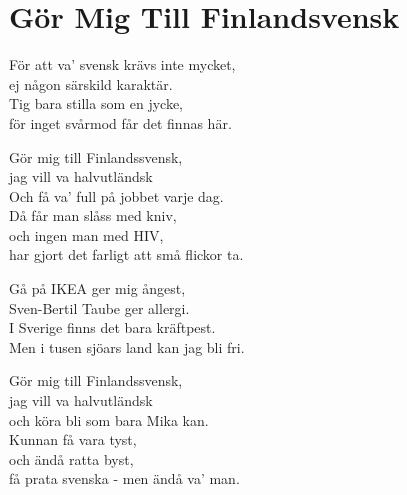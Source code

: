 \section{Gör Mig Till Finlandsvensk}
För att va’ svensk krävs inte mycket,\\
ej någon särskild karaktär.\\
Tig bara stilla som en jycke,\\
för inget svårmod får det finnas här.

Gör mig till Finlandssvensk,\\
jag vill va halvutländsk\\
Och få va’ full på jobbet varje dag.\\
Då får man slåss med kniv,\\
och ingen man med HIV,\\
har gjort det farligt att små flickor ta.

Gå på IKEA ger mig ångest,\\
Sven-Bertil Taube ger allergi.\\
I Sverige finns det bara kräftpest.\\
Men i tusen sjöars land kan jag bli fri.

Gör mig till Finlandssvensk,\\
jag vill va halvutländsk\\
och köra bli som bara Mika kan.\\
Kunnan få vara tyst,\\
och ändå ratta byst,\\
få prata svenska - men ändå va’ man.